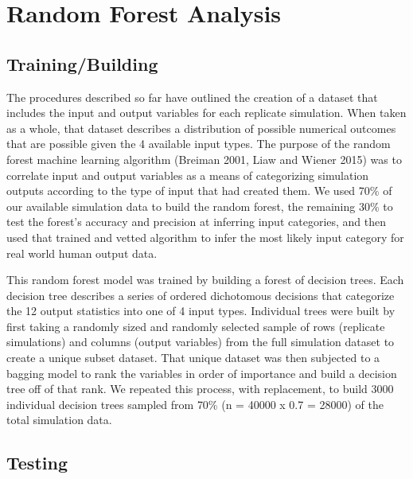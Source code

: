 \documentclass[]{book}
\theoremstyle{definition}
\theoremstyle{definition}
\theoremstyle{definition}
\theoremstyle{remark}
\begin{document}
\section{Random Forest Analysis}\label{random-forest-analysis}

\subsection{Training/Building}\label{trainingbuilding}

The procedures described so far have outlined the creation of a dataset
that includes the input and output variables for each replicate
simulation. When taken as a whole, that dataset describes a distribution
of possible numerical outcomes that are possible given the 4 available
input types. The purpose of the random forest machine learning algorithm
(Breiman 2001, Liaw and Wiener 2015) was to correlate input and output
variables as a means of categorizing simulation outputs according to the
type of input that had created them. We used 70\% of our available
simulation data to build the random forest, the remaining 30\% to test
the forest's accuracy and precision at inferring input categories, and
then used that trained and vetted algorithm to infer the most likely
input category for real world human output data.

This random forest model was trained by building a forest of decision
trees. Each decision tree describes a series of ordered dichotomous
decisions that categorize the 12 output statistics into one of 4 input
types. Individual trees were built by first taking a randomly sized and
randomly selected sample of rows (replicate simulations) and columns
(output variables) from the full simulation dataset to create a unique
subset dataset. That unique dataset was then subjected to a bagging
model to rank the variables in order of importance and build a decision
tree off of that rank. We repeated this process, with replacement, to
build 3000 individual decision trees sampled from 70\% (n = 40000 x 0.7
= 28000) of the total simulation data.

\subsection{Testing}\label{testing}
\end{document}
